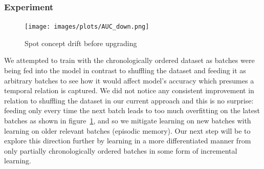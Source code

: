 % 


% 


\subsubsection{Experiment}


\begin{figure}[htbp!]
	\centering
	\texttt{[image: images/plots/AUC\_down.png]}
	\caption{Spot concept drift before upgrading}
	\label{fig:concept_drift_capture}
\end{figure}


We attempted to train with the chronologically ordered dataset as batches were being fed into the model in contrast to shuffling the dataset and feeding it as arbitrary batches to see how it would affect model’s accuracy which presumes a temporal relation is captured. We did not notice any consistent improvement in relation to shuffling the dataset in our current approach and this is no surprise: feeding only every time the next batch leads to too much overfitting on the latest batches as shown in figure~\ref{fig:concept_drift_capture}, and so we mitigate learning on new batches with learning on older relevant batches (episodic memory). Our next step will be to explore this direction further by learning in a more differentiated manner from only partially chronologically ordered batches in some form of incremental learning.

